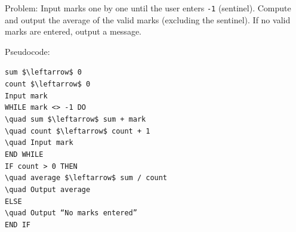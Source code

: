 \documentclass[11pt]{article}
\begin{document}
Problem: Input marks one by one until the user enters \texttt{-1} (sentinel). Compute and output the average of the valid marks (excluding the sentinel). If no valid marks are entered, output a message.

Pseudocode:
\begin{center}
\texttt{sum \$\textbackslash{}leftarrow\$ 0}\\
\texttt{count \$\textbackslash{}leftarrow\$ 0}\\
\texttt{Input mark}\\
\texttt{WHILE mark <> -1 DO}\\
\texttt{\textbackslash{}quad sum \$\textbackslash{}leftarrow\$ sum + mark}\\
\texttt{\textbackslash{}quad count \$\textbackslash{}leftarrow\$ count + 1}\\
\texttt{\textbackslash{}quad Input mark}\\
\texttt{END WHILE}\\
\texttt{IF count > 0 THEN}\\
\texttt{\textbackslash{}quad average \$\textbackslash{}leftarrow\$ sum / count}\\
\texttt{\textbackslash{}quad Output average}\\
\texttt{ELSE}\\
\texttt{\textbackslash{}quad Output ``No marks entered''}\\
\texttt{END IF}
\end{center}
\end{document}
